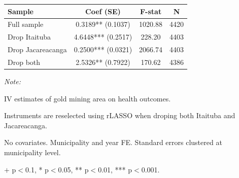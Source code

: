 {\small

\begin{tabular}[t]{lccc}
\toprule
Sample & Coef (SE) & F-stat & N\\
\midrule
Full sample & 0.3189** (0.1037) & 1020.88 & 4420\\
Drop Itaituba & 4.6448*** (0.2517) & 228.20 & 4403\\
Drop Jacareacanga & 0.2500*** (0.0321) & 2066.74 & 4403\\
Drop both & 2.5326** (0.7922) & 170.62 & 4386\\
\bottomrule
\end{tabular}
\begin{tablenotes}
\item \textit{Note: } 
\item IV estimates of gold mining area on health outcomes.
\item Instruments are reselected using rLASSO when droping both Itaituba and Jacareacanga.
\item No covariates. Municipality and year FE. Standard errors clustered at municipality level.
\item $+$ p$<$0.1, * p$<$0.05, ** p$<$0.01, *** p$<$0.001.
\end{tablenotes}
}
